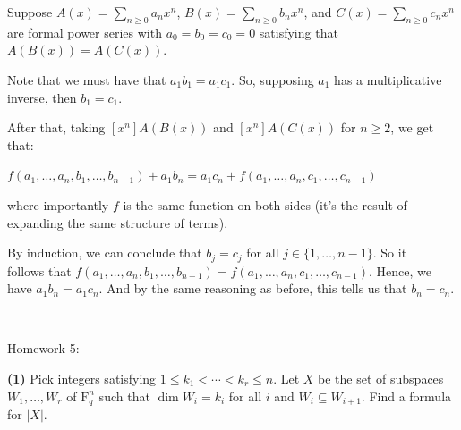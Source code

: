 \documentclass{book}
\newcommand{\exOne}{%
   \color{Purple}%
   \fontsize{13}{15}\selectfont%
}
\newenvironment{myIndent}{%
   \begin{adjustwidth}{2.5em}{0em}%
}{%
   \end{adjustwidth}%
}
\newcommand{\blab}[1]{\textbf{#1}}
\newcommand{\brm}[1]{\bm{\mathrm{#1}}}
\newcommand{\mySepTwo}[1][.]{%
   {\noindent\color{#1}{\rule{6.5in}{0.5mm}}}\\%
}
\newcommand{\retTwo}{\hfill\bigbreak}
\newcommand{\mHeader}[1]{{
   \color{Black}%
   \fontsize{20}{18}\selectfont%
   #1\retTwo
}}
\begin{document}
\begin{myIndent}\exOne
   Suppose $A(x) = \sum\limits_{n \geq 0}a_nx^n$, $B(x)  = \sum\limits_{n \geq 0}b_nx^n$, and $C(x) = \sum\limits_{n \geq 0}c_nx^n$ are formal power series with $a_0 = b_0 = c_0 = 0$ satisfying that $A(B(x)) = A(C(x))$.\retTwo

   Note that we must have that $a_1b_1 = a_1c_1$. So, supposing $a_1$ has a multiplicative inverse, then $b_1 = c_1$.\newpage

   After that, taking $[x^n]A(B(x))$ and $[x^n]A(C(x))$ for $n \geq 2$, we get that:\\ [-8pt]

   {\centering $f(a_1, \ldots, a_n, b_1, \ldots, b_{n-1}) + a_1b_n = a_1c_n + f(a_1, \ldots, a_n, c_1, \ldots, c_{n-1})$\\ [6pt]\par}

   where importantly $f$ is the same function on both sides (it's the result of expanding the same structure of terms).\retTwo

   By induction, we can conclude that $b_j = c_j$ for all $j \in \{1, \ldots, n-1\}$. So it\\ follows that $f(a_1, \ldots, a_n, b_1, \ldots, b_{n-1}) = f(a_1, \ldots, a_n, c_1, \ldots, c_{n-1})$. Hence, we have $a_1b_n = a_1c_n$. And by the same reasoning as before, this tells us that $b_n = c_n$.\retTwo
\end{myIndent}

\mySepTwo

\newpage

\mHeader{Homework 5:}

\blab{(1)} Pick integers satisfying $1 \leq k_1 < \cdots < k_r \leq n$. Let $X$ be the set of subspaces $W_1, \ldots, W_r$ of $\brm{F}_q^n$ such that $\dim W_i = k_i$ for all $i$ and $W_i \subseteq W_{i+1}$. Find a formula for $|X|$.
\end{document}
